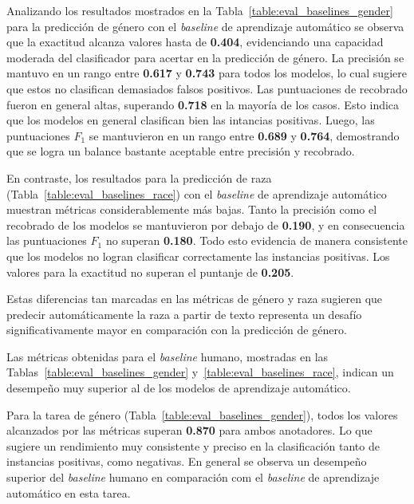 Analizando los resultados mostrados en la Tabla~\ref{table:eval_baselines_gender} para la predicci\'on de g\'enero con el 
\emph{baseline} de aprendizaje autom\'atico se observa que la exactitud alcanza valores hasta de \textbf{0.404}, 
evidenciando una capacidad moderada del clasificador para acertar en la predicci\'on de g\'enero. La precisi\'on se 
mantuvo en un rango entre \textbf{0.617} y \textbf{0.743} para todos los modelos, lo cual sugiere que estos no
clasifican demasiados falsos positivos. Las puntuaciones de recobrado fueron en general altas, superando \textbf{0.718}
en la mayor\'ia de los casos. Esto indica que los modelos en general clasifican bien las intancias positivas. Luego, las 
puntuaciones $F_1$ se mantuvieron en un rango entre \textbf{0.689} y \textbf{0.764}, demostrando que se logra
un balance bastante aceptable entre precisi\'on y recobrado.%

En contraste, los resultados para la predicci\'on de raza (Tabla~\ref{table:eval_baselines_race}) con el 
\emph{baseline} de aprendizaje autom\'atico muestran m\'etricas considerablemente m\'as bajas. Tanto la 
precisi\'on como el recobrado de los modelos se mantuvieron por debajo de \textbf{0.190}, y en consecuencia 
las puntuaciones $F_1$ no superan \textbf{0.180}. Todo esto evidencia de manera consistente que los modelos no 
logran clasificar correctamente las instancias positivas. Los valores para la exactitud no superan el puntanje 
de \textbf{0.205}. 

Estas diferencias tan marcadas en las m\'etricas de g\'enero y raza sugieren que predecir autom\'aticamente la 
raza a partir de texto representa un desaf\'io significativamente mayor en comparaci\'on con la predicci\'on de 
g\'enero. 

Las m\'etricas obtenidas para el \emph{baseline} humano, mostradas en las 
Tablas~\ref{table:eval_baselines_gender} y~\ref{table:eval_baselines_race}, indican un desempe\~no muy 
superior al de los modelos de aprendizaje autom\'atico. 

Para la tarea de g\'enero (Tabla~\ref{table:eval_baselines_gender}), todos los valores alcanzados
por las m\'etricas superan \textbf{0.870} para ambos anotadores. Lo que sugiere un 
rendimiento muy consistente y preciso en la clasificaci\'on tanto de instancias positivas, 
como negativas. En general se observa un desempe\~no superior del 
\emph{baseline} humano en comparaci\'on com el \emph{baseline} de aprendizaje autom\'atico en 
esta tarea.

